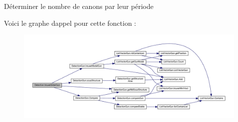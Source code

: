 Déterminer le nombre de canons par leur période 

Voici le graphe d\textquotesingle{}appel pour cette fonction \+:
\nopagebreak
\begin{figure}[H]
\begin{center}
\leavevmode
\includegraphics[width=350pt]{class_detection_aa21c434f39d4e9d901635d9db2a4bbca_cgraph}
\end{center}
\end{figure}
